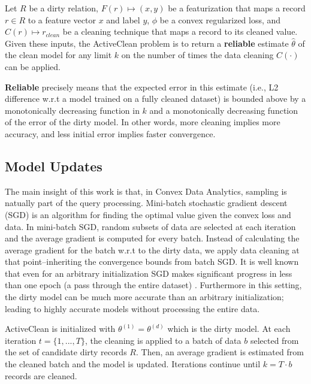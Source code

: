 \begin{problem}\label{activeclean}\sloppy
Let $R$ be a dirty relation, $F(r) \mapsto (x,y)$ be a featurization that maps
a record $r \in R$ to a feature vector $x$ and label $y$, $\phi$ be a convex regularized loss,
and $C(r) \mapsto r_{clean}$ be a cleaning technique that maps a record to its cleaned value. 
Given these inputs, the ActiveClean problem is to return a \textbf{reliable} estimate $\hat{\theta}$ of the clean model for any limit $k$ on the number of times the data cleaning $C(\cdot)$ can be applied.

\vspace{0.5em}

\textbf{Reliable} precisely means that the expected error in this estimate (i.e., L2 difference w.r.t a model trained on a fully cleaned dataset) is bounded above by a monotonically decreasing function in $k$ and a monotonically decreasing function of the error of the dirty model. In other words, more cleaning implies more accuracy, and less initial error implies faster convergence.
\end{problem}

\subsection{Model Updates}
The main insight of this work is that, in Convex Data Analytics, sampling is natually part of the query processing.
Mini-batch stochastic gradient descent (SGD) is an algorithm for finding the optimal value
given the convex loss and data.
In mini-batch SGD, random subsets of data are selected at each iteration and the average gradient is computed for every batch.
Instead of calculating the average gradient for the batch w.r.t to the dirty data, we apply data cleaning at that point--inheriting the convergence bounds from batch SGD.
It is well known that even for an arbitrary initialization SGD makes significant progress in less than one epoch (a pass through the entire dataset) \cite{bottou2012stochastic}.
Furthermore in this setting, the dirty model can be much more accurate than an arbitrary initialization; leading to highly accurate models without processing the entire data.

ActiveClean is initialized with $\theta^{(1)} = \theta^{(d)}$ which is the dirty model.
At each iteration $t=\{1,...,T\}$, the cleaning is applied to a batch of data $b$ selected from the set of candidate dirty records $R$.
Then, an average gradient is estimated from the cleaned batch and the model is updated.
Iterations continue until $k = T \cdot b$ records are cleaned.

